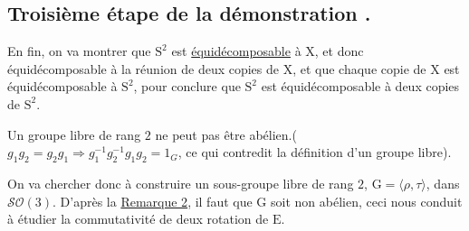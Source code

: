 \subsection{Troisième étape de la démonstration .}
\noindent
 En fin, on va montrer que $\mathrm{S}^2$ est \hyperref[ed]{équidécomposable} à $\mathrm{X}$, et donc équidécomposable à la réunion de deux copies de $\mathrm{X}$, et que chaque copie de $\mathrm{X}$ est équidécomposable à $\mathrm{S}^2$, pour conclure que $\mathrm{S}^2$ est équidécomposable à deux copies de $\mathrm{S}^2$.

\begin{remarkk}\label{remarque1}
  Un groupe libre de rang $2$ ne peut pas être abélien.($g_1g_2 = g_2g_1 \Rightarrow g_1^{-1}g_2^{-1}g_1g_2=1_G$, ce qui contredit la définition d'un groupe libre).
\end{remarkk}
\noindent
On va chercher donc à construire un sous-groupe libre de rang $2$, $\mathrm{G} = \langle \rho, \tau \rangle$, dans $\mathcal{SO}(3)$. D'après la \hyperref[remarque1]{Remarque 2}, il faut que $\mathrm{G}$ soit non abélien, ceci nous conduit à étudier la commutativité de deux rotation de $\mathrm{E}$.
